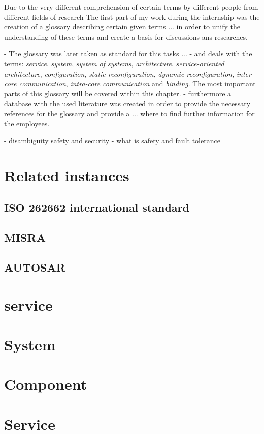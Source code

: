 Due to the very different comprehension of certain terms by different people from different fields of research 
The first part of my work during the internship was the creation of a glossary describing certain given terms
... in order to unify the understanding of these terms and create a basis for discussions ans researches.

- The glossary was later taken as standard for this tasks ...
- and deals with the terms: \emph{service}, \emph{system}, \emph{system of systems}, \emph{architecture}, \emph{service-oriented architecture}, \emph{configuration}, \emph{static reconfiguration}, \emph{dynamic reconfiguration}, \emph{inter-core communication}, \emph{intra-core communication} and \emph{binding}.
The most important parts of this glossary will be covered within this chapter.
- furthermore a database with the used literature was created in order to provide the necessary references for the glossary and provide a ... where to find further information for the employees. 

- disambiguity safety and security
- what is safety and fault tolerance

\section{Related instances}
\subsection{ISO 262662 international standard}
\subsection{MISRA}
\subsection{AUTOSAR}
\section{service}

\section{System}

\section{Component}

\section{Service}

